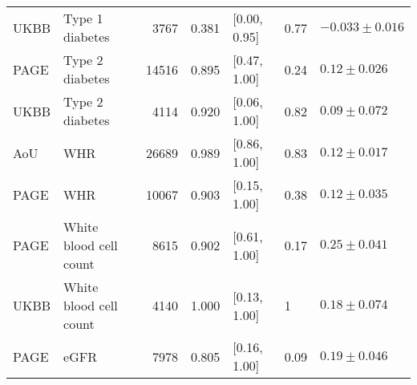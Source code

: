 \begin{tabular}{llrrlll}
 UKBB &          Type 1 diabetes &  3767 & 0.381 &              [0.00, 0.95] &    0.77 & $-0.033 \pm 0.016$ \\
 PAGE &          Type 2 diabetes & 14516 & 0.895 &              [0.47, 1.00] &    0.24 &   $0.12 \pm 0.026$ \\
 UKBB &          Type 2 diabetes &  4114 & 0.920 &              [0.06, 1.00] &    0.82 &   $0.09 \pm 0.072$ \\
  AoU &                      WHR & 26689 & 0.989 &              [0.86, 1.00] &    0.83 &   $0.12 \pm 0.017$ \\
 PAGE &                      WHR & 10067 & 0.903 &              [0.15, 1.00] &    0.38 &   $0.12 \pm 0.035$ \\
 PAGE &   White blood cell count &  8615 & 0.902 &              [0.61, 1.00] &    0.17 &   $0.25 \pm 0.041$ \\
 UKBB &   White blood cell count &  4140 & 1.000 &              [0.13, 1.00] &       1 &   $0.18 \pm 0.074$ \\
 PAGE &                     eGFR &  7978 & 0.805 &              [0.16, 1.00] &    0.09 &   $0.19 \pm 0.046$ \\
\bottomrule
\end{tabular}
